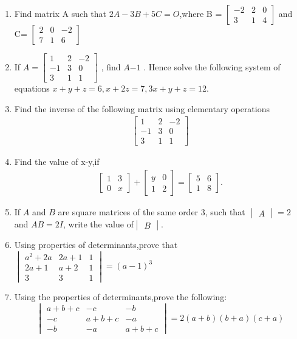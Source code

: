 \documentclass{article}
\begin{document}
\providecommand{\mydet}[1]{\ensuremath{\begin{vmatrix}#1\end{vmatrix}}}
\providecommand{\myvec}[1]{\ensuremath{\begin{bmatrix}#1\end{bmatrix}}}
\providecommand{\brak}[1]{\ensuremath{\left(#1\right)}}
\providecommand{\cbrak}[1]{\ensuremath{\left\{#1\right\}}}
\begin{enumerate}
\section {Matrices}
             \item \noindent Find matrix A such that $ 2A - 3B + 5C = O $,where B = $\myvec{-2 & 2 & 0 \\3 & 1 & 4 }$ and C= $\myvec{2&0&-2\\7&1&6 }$
             \item If $A=\myvec {1&2&-2 \\-1 &3&0\\3&1&1}$ , find $A{-1}$ . Hence solve the following system of equations $x+y+z= 6,x+2z=7,3x+y+z=12$. 
	     \item Find the inverse of the following matrix using elementary operations \begin{align*}\myvec{1&2&-2\\-1&3&0\\3&1&1}\end{align*}
		     \item Find the value of x-y,if \begin{align*}\myvec{1&3\\0&x}+\myvec{y&0\\1&2}=\myvec{5&6\\1&8}.\end{align*} 
              \item If $A$ and $B$ are square matrices of the same order 3, such that $\mydet{A} = 2$ and $AB = 2I$, write the value of$\mydet{B}$.
              \item Using properties of determinants,prove that $\mydet{a^2+2a & 2a+1 & 1\\2a +1& a+2 & 1\\3 & 3 & 1}= (a-1)^3$
              \item Using the properties of determinants,prove the following:\[\mydet{a+b+c&-c&-b\\-c&a+b+c&-a\\-b&-a&a+b+c}=2(a+b)(b+a)(c+a)\]             

\end{enumerate}
\end{document}
